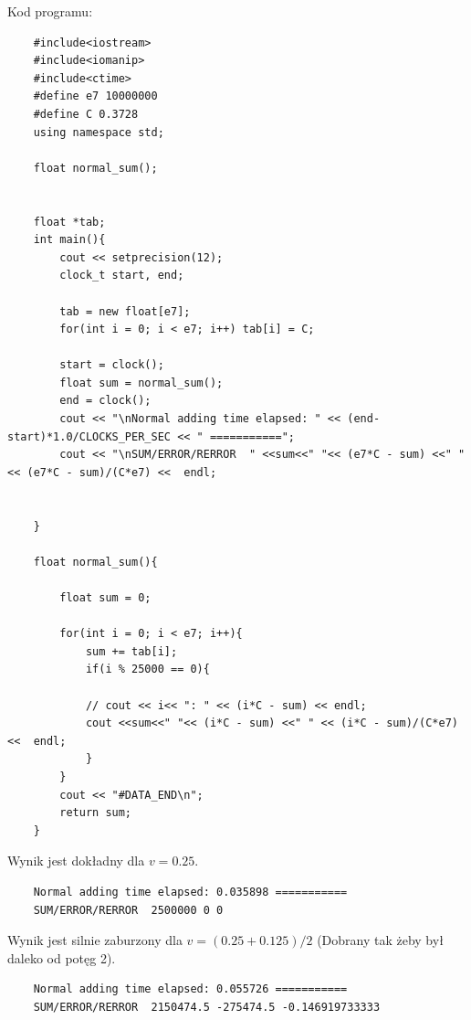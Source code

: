 \documentclass{article}
\begin{document}
Kod programu:

\begin{verbatim}
	#include<iostream>
	#include<iomanip>
	#include<ctime>
	#define e7 10000000
	#define C 0.3728
	using namespace std;

	float normal_sum();


	float *tab;
	int main(){
		cout << setprecision(12);
		clock_t start, end;

		tab = new float[e7];
		for(int i = 0; i < e7; i++) tab[i] = C;

		start = clock();
		float sum = normal_sum();
		end = clock();
		cout << "\nNormal adding time elapsed: " << (end-start)*1.0/CLOCKS_PER_SEC << " ===========";
		cout << "\nSUM/ERROR/RERROR  " <<sum<<" "<< (e7*C - sum) <<" " << (e7*C - sum)/(C*e7) <<  endl;


	}

	float normal_sum(){
	
		float sum = 0;

		for(int i = 0; i < e7; i++){
			sum += tab[i];
			if(i % 25000 == 0){

			// cout << i<< ": " << (i*C - sum) << endl;
			cout <<sum<<" "<< (i*C - sum) <<" " << (i*C - sum)/(C*e7) <<  endl;
			}
		} 
		cout << "#DATA_END\n";
		return sum;
	}

\end{verbatim}

\clearpage
\newpage

Wynik jest dokładny dla $v = 0.25$.

\begin{lstlisting}
	Normal adding time elapsed: 0.035898 ===========
	SUM/ERROR/RERROR  2500000 0 0
\end{lstlisting}


Wynik jest silnie zaburzony dla $v = (0.25+0.125)/2$ (Dobrany tak żeby był daleko od potęg 2).

\begin{lstlisting}
	Normal adding time elapsed: 0.055726 ===========
	SUM/ERROR/RERROR  2150474.5 -275474.5 -0.146919733333	
\end{lstlisting}
\end{document}
